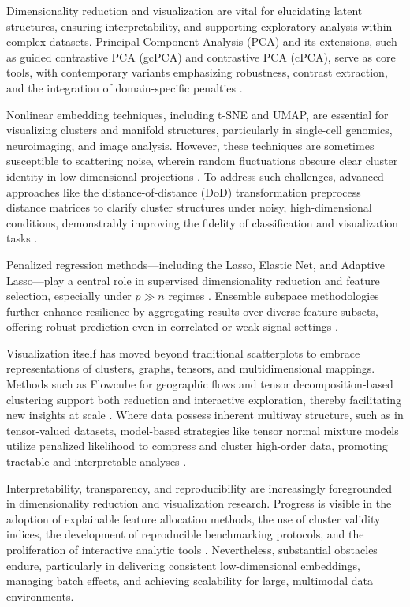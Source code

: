 \documentclass[sigconf]{acmart}
\begin{document}
Dimensionality reduction and visualization are vital for elucidating latent structures, ensuring interpretability, and supporting exploratory analysis within complex datasets. Principal Component Analysis (PCA) and its extensions, such as guided contrastive PCA (gcPCA) and contrastive PCA (cPCA), serve as core tools, with contemporary variants emphasizing robustness, contrast extraction, and the integration of domain-specific penalties \cite{ref97,ref99}.

Nonlinear embedding techniques, including t-SNE and UMAP, are essential for visualizing clusters and manifold structures, particularly in single-cell genomics, neuroimaging, and image analysis. However, these techniques are sometimes susceptible to scattering noise, wherein random fluctuations obscure clear cluster identity in low-dimensional projections \cite{ref99}. To address such challenges, advanced approaches like the distance-of-distance (DoD) transformation preprocess distance matrices to clarify cluster structures under noisy, high-dimensional conditions, demonstrably improving the fidelity of classification and visualization tasks \cite{ref99}.

Penalized regression methods—including the Lasso, Elastic Net, and Adaptive Lasso—play a central role in supervised dimensionality reduction and feature selection, especially under \(p \gg n\) regimes \cite{ref101}. Ensemble subspace methodologies further enhance resilience by aggregating results over diverse feature subsets, offering robust prediction even in correlated or weak-signal settings \cite{ref116}.

Visualization itself has moved beyond traditional scatterplots to embrace representations of clusters, graphs, tensors, and multidimensional mappings. Methods such as Flowcube for geographic flows and tensor decomposition-based clustering support both reduction and interactive exploration, thereby facilitating new insights at scale \cite{ref53,ref58,ref79,ref86,ref91,ref92,ref94,ref95,ref99}. Where data possess inherent multiway structure, such as in tensor-valued datasets, model-based strategies like tensor normal mixture models utilize penalized likelihood to compress and cluster high-order data, promoting tractable and interpretable analyses \cite{ref92}.

Interpretability, transparency, and reproducibility are increasingly foregrounded in dimensionality reduction and visualization research. Progress is visible in the adoption of explainable feature allocation methods, the use of cluster validity indices, the development of reproducible benchmarking protocols, and the proliferation of interactive analytic tools \cite{ref53,ref79,ref90,ref92,ref96,ref99}. Nevertheless, substantial obstacles endure, particularly in delivering consistent low-dimensional embeddings, managing batch effects, and achieving scalability for large, multimodal data environments.
\end{document}

